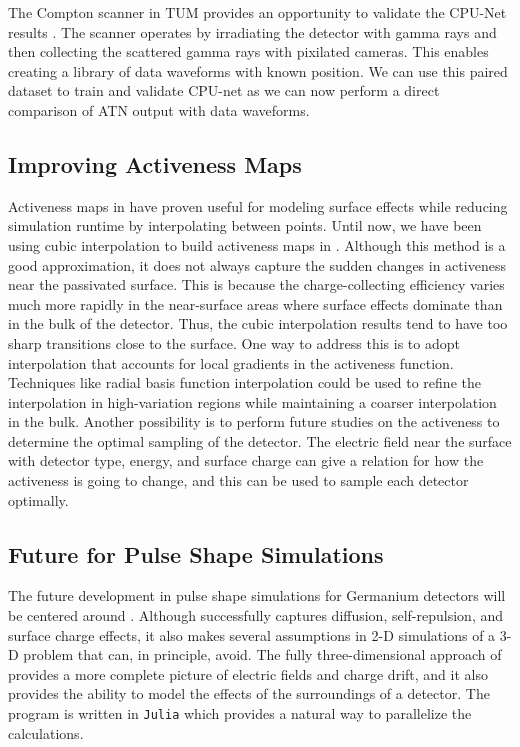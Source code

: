 The Compton scanner in TUM provides an opportunity to validate the CPU-Net results \cite{Abt_2022odr}. The scanner operates by irradiating the detector with gamma rays and then collecting the scattered gamma rays with pixilated cameras. This enables creating a library of data waveforms with known position.
We can use this paired dataset to train and validate CPU-net as we can now perform a direct comparison of ATN output with data waveforms.

\subsection{Improving {\ehd} Activeness Maps}
Activeness maps in {\ehd} have proven useful for modeling surface effects while reducing simulation runtime by interpolating between points. Until now, we have been using cubic interpolation to build activeness maps in {\ehd}. Although this method is a good approximation, it does not always capture the sudden changes in activeness near the passivated surface. This is because the charge-collecting efficiency varies much more rapidly in the near-surface areas where surface effects dominate than in the bulk of the detector. Thus, the cubic interpolation results tend to have too sharp transitions close to the surface. One way to address this is to adopt interpolation that accounts for local gradients in the activeness function. Techniques like radial basis function interpolation could be used to refine the interpolation in high-variation regions while maintaining a coarser interpolation in the bulk. Another possibility is to perform future studies on the activeness to determine the optimal sampling of the detector. The electric field near the surface with detector type, energy, and surface charge can give a relation for how the activeness is going to change, and this can be used to sample each detector optimally.

\subsection{Future for Pulse Shape Simulations}
The future development in pulse shape simulations for Germanium detectors will be centered around {\ssd} . Although {\ehd} successfully captures diffusion, self-repulsion, and surface charge effects, it also makes several assumptions in 2-D simulations of a 3-D problem that {\ssd} can, in principle, avoid. The fully three-dimensional approach of {\ssd} provides a more complete picture of electric fields and charge drift, and it also provides the ability to model the effects of the surroundings of a detector. The program is written in \texttt{Julia} which provides a natural way to parallelize the calculations.

